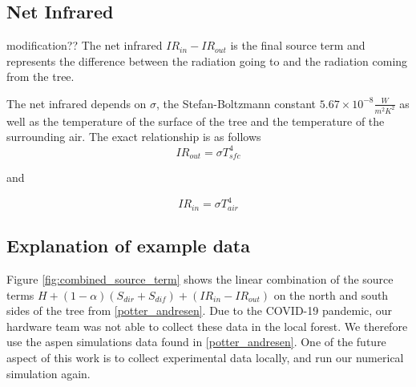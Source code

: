 \documentclass{IEEEtran} %
\begin{document}
\subsection{Net Infrared}
{\bluep modification??}
The net infrared $IR_{in}-IR_{out}$ is the final source term and represents the difference between the radiation going to and the radiation coming from the tree.  

The net infrared depends on $\sigma$, the Stefan-Boltzmann constant $5.67\times 10^{-8} \frac{W}{m^2K^2}$ as well as the temperature of the surface of the tree and the temperature of the surrounding air. The exact relationship is as follows
\begin{equation}
IR_{out} = \sigma T_{sfc}^4
\end{equation}

and

\begin{equation}
IR_{in} = \sigma T_{air}^4
\end{equation}


\subsection{Explanation of example data}

Figure \ref{fig:combined_source_term} shows the linear combination of the source terms $H + (1-\alpha)(S_{dir}+S_{dif})+(IR_{in}-IR_{out})$ on the north and south sides of the tree from \ref{potter_andresen}. 
Due to the COVID-19 pandemic, our hardware team was not able to collect these data in the local forest. We therefore use the aspen simulations data found in \ref{potter_andresen}. One of the future aspect of this work is to collect experimental data locally, and run our numerical simulation again.
\end{document}
